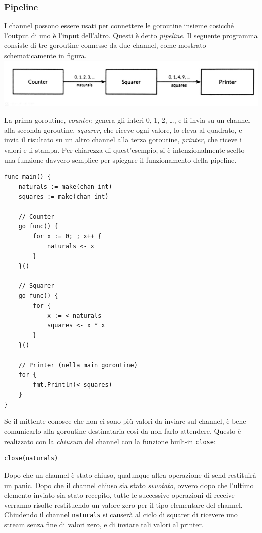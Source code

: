 \documentclass[../../../thesis.tex]{subfiles}
\begin{document}
    \subsubsection{Pipeline}
    I channel possono essere usati per connettere le goroutine insieme cosicché l'output di uno è l'input dell'altro.
    Questi è detto \textit{pipeline}.
    Il seguente programma consiste di tre goroutine connesse da due channel, come mostrato schematicamente in figura.
    \center\includegraphics[scale = 0.25]{figure-8.1}

    \justifying\noindent La prima goroutine, \textit{counter}, genera gli interi 0, 1, 2, \ldots, e li invia su un channel alla seconda goroutine, \textit{squarer}, che riceve ogni valore, lo eleva al quadrato, e invia il risultato su un altro channel alla terza goroutine, \textit{printer}, che riceve i valori e li stampa.
    Per chiarezza di quest'esempio, si è intenzionalmente scelto una funzione davvero semplice per spiegare il funzionamento della pipeline.
    \begin{lstlisting}[frame = single,label={lst:lstlisting7-4-2.1}]
func main() {
    naturals := make(chan int)
    squares := make(chan int)

    // Counter
    go func() {
        for x := 0; ; x++ {
            naturals <- x
        }
    }()

    // Squarer
    go func() {
        for {
            x := <-naturals
            squares <- x * x
        }
    }()

    // Printer (nella main goroutine)
    for {
        fmt.Println(<-squares)
    }
}
    \end{lstlisting}
    Se il mittente conosce che non ci sono più valori da inviare sul channel, è bene comunicarlo alla goroutine destinataria così da non farlo attendere.
    Questo è realizzato con la \textit{chiusura} del channel con la funzione built-in \verb"close":
    \begin{lstlisting}[frame = single,label={lst:lstlisting7-4-2.2}]
close(naturals)
    \end{lstlisting}
    Dopo che un channel è stato chiuso, qualunque altra operazione di send restituirà un panic.
    Dopo che il channel chiuso sia stato \textit{svuotato}, ovvero dopo che l'ultimo elemento inviato sia stato recepito, tutte le successive operazioni di receive verranno risolte restituendo un valore zero per il tipo elementare del channel.
    Chiudendo il channel \verb"naturals" si causerà al ciclo di squarer di ricevere uno stream senza fine di valori zero, e di inviare tali valori al printer.
    \hfill \vspace{12pt}
\end{document}
